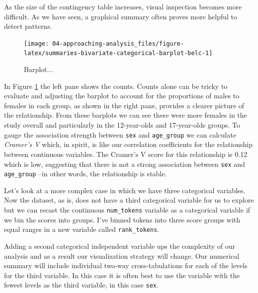 \documentclass[
]{article}
\begin{document}
As the size of the contingency table increases, visual inspection becomes more difficult. As we have seen, a graphical summary often proves more helpful to detect patterns.

\begin{figure}

{\centering \texttt{[image: 04-approaching-analysis\_files/figure-latex/summaries-bivariate-categorical-barplot-belc-1]} 

}

\caption{Barplot...}\label{fig:summaries-bivariate-categorical-barplot-belc}
\end{figure}

In Figure \ref{fig:summaries-bivariate-categorical-barplot-belc} the left pane shows the counts. Counts alone can be tricky to evaluate and adjusting the barplot to account for the proportions of males to females in each group, as shown in the right pane, provides a clearer picture of the relationship. From these barplots we can see there were more females in the study overall and particularly in the 12-year-olds and 17-year-olds groups. To gauge the association strength between \texttt{sex} and \texttt{age\_group} we can calculate \emph{Cramer's V} which, in spirit, is like our correlation coefficients for the relationship between continuous variables. The Cramer's V score for this relationship is 0.12 which is low, suggesting that there is not a strong association between \texttt{sex} and \texttt{age\_group} --in other words, the relationship is stable.

Let's look at a more complex case in which we have three categorical variables. Now the dataset, as is, does not have a third categorical variable for us to explore but we can recast the continuous \texttt{num\_tokens} variable as a categorical variable if we bin the scores into groups. I've binned tokens into three score groups with equal ranges in a new variable called \texttt{rank\_tokens}.

Adding a second categorical independent variable ups the complexity of our analysis and as a result our visualization strategy will change. Our numerical summary will include individual two-way cross-tabulations for each of the levels for the third variable. In this case it is often best to use the variable with the fewest levels as the third variable, in this case \texttt{sex}.
\end{document}
